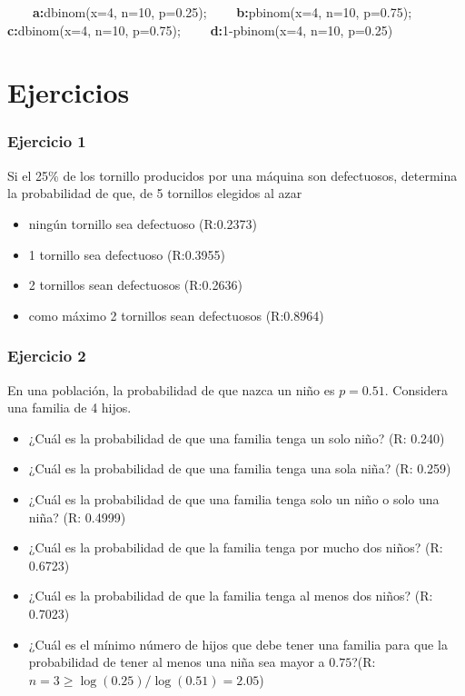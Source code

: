 \documentclass[
]{book}
\providecommand{\tightlist}{%
  \setlength{\itemsep}{0pt}\setlength{\parskip}{0pt}}
\begin{document}
\textbf{\(\qquad\)a:}dbinom(x=4, n=10, p=0.25); \textbf{\(\qquad\)b:}pbinom(x=4, n=10, p=0.75); \textbf{\(\qquad\)c:}dbinom(x=4, n=10, p=0.75); \textbf{\(\qquad\)d:}1-pbinom(x=4, n=10, p=0.25)

\hypertarget{ejercicios-5}{%
\section{Ejercicios}\label{ejercicios-5}}

\hypertarget{ejercicio-1-4}{%
\subsubsection{Ejercicio 1}\label{ejercicio-1-4}}

Si el 25\% de los tornillo producidos por una máquina son defectuosos, determina la probabilidad de que, de
5 tornillos elegidos al azar

\begin{itemize}
\tightlist
\item
  ningún tornillo sea defectuoso (R:0.2373)
\item
  1 tornillo sea defectuoso (R:0.3955)
\item
  2 tornillos sean defectuosos (R:0.2636)
\item
  como máximo 2 tornillos sean defectuosos (R:0.8964)
\end{itemize}

\hypertarget{ejercicio-2-4}{%
\subsubsection{Ejercicio 2}\label{ejercicio-2-4}}

En una población, la probabilidad de que nazca un niño es \(p=0.51\). Considera una familia de 4 hijos.

\begin{itemize}
\tightlist
\item
  ¿Cuál es la probabilidad de que una familia tenga un solo niño? (R: 0.240)
\item
  ¿Cuál es la probabilidad de que una familia tenga una sola niña? (R: 0.259)
\item
  ¿Cuál es la probabilidad de que una familia tenga solo un niño o solo una niña? (R: 0.4999)
\item
  ¿Cuál es la probabilidad de que la familia tenga por mucho dos niños? (R: 0.6723)
\item
  ¿Cuál es la probabilidad de que la familia tenga al menos dos niños? (R: 0.7023)
\item
  ¿Cuál es el mínimo número de hijos que debe tener una familia para que la probabilidad de tener al menos una niña sea mayor a \(0.75\)?(R:\(n=3 \geq\log(0.25)/\log(0.51)=2.05\))
\end{itemize}
\end{document}
